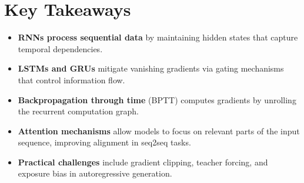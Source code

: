 
\section*{Key Takeaways}

\begin{keytakeaways}
\begin{itemize}[leftmargin=2em]
    \item \textbf{RNNs process sequential data} by maintaining hidden states that capture temporal dependencies.
    \item \textbf{LSTMs and GRUs} mitigate vanishing gradients via gating mechanisms that control information flow.
    \item \textbf{Backpropagation through time} (BPTT) computes gradients by unrolling the recurrent computation graph.
    \item \textbf{Attention mechanisms} allow models to focus on relevant parts of the input sequence, improving alignment in seq2seq tasks.
    \item \textbf{Practical challenges} include gradient clipping, teacher forcing, and exposure bias in autoregressive generation.
\end{itemize}
\end{keytakeaways}


